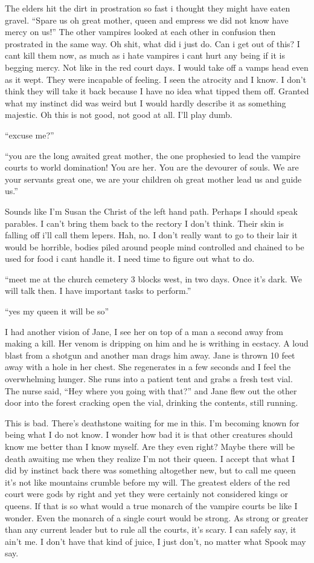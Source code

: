 The elders hit the dirt in prostration so fast i thought they might have eaten gravel. ``Spare us oh great mother, queen and empress we did not know have mercy on us!'' The other vampires looked at each other in confusion then prostrated in the same way. Oh shit, what did i just do. Can i get out of this? I cant kill them now, as much as i hate vampires i cant hurt any being if it is begging mercy. Not like in the red court days. I would take off a vamps head even as it wept. They were incapable of feeling. I seen the atrocity and I know. I don't think they will take it back because I have no idea what tipped them off.  Granted what my instinct did was weird but I would hardly describe it as something majestic. Oh this is not good, not good at all. I'll play dumb.

``excuse me?''

``you are the long awaited great mother, the one prophesied to lead the vampire courts to world domination! You are her. You are the devourer of souls. We are your servants great one, we are your children oh great mother lead us and guide us.''

Sounds like I'm Susan the Christ of the left hand path. Perhaps I should speak parables. I can't bring them back to the rectory I don't think. Their skin is falling off i'll call them lepers. Hah, no. I don't really want to go to their lair it would be horrible, bodies piled around people mind controlled and chained to be used for food i cant handle it. I need time to figure out what to do.

``meet me at the church cemetery 3 blocks west, in two days. Once it's dark. We will talk then. I have important tasks to perform.''

``yes my queen it will be so''

I had another vision of Jane, I see her on top of a man a second away from making a kill. Her venom is dripping on him and he is writhing in ecstacy. A loud blast from a shotgun and another man drags him away. Jane is thrown 10 feet away with a hole in her chest. She regenerates in a few seconds and I feel the overwhelming hunger. She runs into a patient tent and grabs a fresh test vial. The nurse said, ``Hey where you going with that?'' and Jane flew out the other door into the forest cracking open the vial, drinking the contents, still running.

This is bad. There's deathstone waiting for me in this. I'm becoming known for being what I do not know. I wonder how bad it is that other creatures should know me better than I know myself. Are they even right? Maybe there will be death awaiting me when they realize I'm not their queen. I accept that what I did by instinct back there was something altogether new, but to call me queen it's not like mountains crumble before my will. The greatest elders of the red court were gods by right and yet they were certainly not considered kings or queens. If that is so what would a true monarch of the vampire courts be like I wonder. Even the monarch of a single court would be strong. As strong or greater than any current leader but to rule all the courts, it's scary. I can safely say, it ain't me. I don't have that kind of juice, I just don't, no matter what Spook may say.

